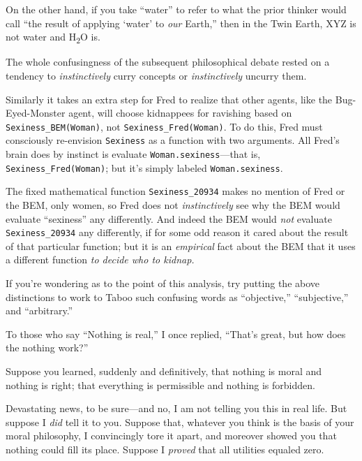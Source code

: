  On the other hand, if you take
``water'' to refer to what the prior
thinker would call ``the result of applying
`water' to \textit{our}
Earth,'' then in the Twin Earth, XYZ is not water and
H\textsubscript{2}O is.


 The whole confusingness of the subsequent philosophical debate
rested on a tendency to \textit{instinctively} curry concepts or
\textit{instinctively} uncurry them.


 Similarly it takes an extra step for Fred to realize that other
agents, like the Bug-Eyed-Monster agent, will choose kidnappees for
ravishing based on \texttt{Sexiness\_BEM(Woman)}, not \texttt{Sexiness\_Fred(Woman)}. To
do this, Fred must consciously re-envision \texttt{Sexiness} as a function with
two arguments. All Fred's brain does by instinct is
evaluate \texttt{Woman.sexiness}---that is, \texttt{Sexiness\_Fred(Woman)}; but
it's simply labeled \texttt{Woman.sexiness}.


 The fixed mathematical function \texttt{Sexiness\_20934} makes no mention
of Fred or the BEM, only women, so Fred does not \textit{instinctively}
see why the BEM would evaluate
``sexiness'' any differently. And
indeed the BEM would \textit{not} evaluate \texttt{Sexiness\_20934} any
differently, if for some odd reason it cared about the result of that
particular function; but it is an \textit{empirical} fact about the BEM
that it uses a different function \textit{to decide who to kidnap.}


 If you're wondering as to the point of this
analysis, try putting the above distinctions to work to Taboo such
confusing words as ``objective,''
``subjective,'' and
``arbitrary.''

\myendsectiontext



 To those who say ``Nothing is
real,'' I once replied,
``That's great, but how does the
nothing work?'' 


 Suppose you learned, suddenly and definitively, that nothing is
moral and nothing is right; that everything is permissible and nothing
is forbidden.


 Devastating news, to be sure---and no, I am not telling you this
in real life. But suppose I \textit{did} tell it to you. Suppose that,
whatever you think is the basis of your moral philosophy, I
convincingly tore it apart, and moreover showed you that nothing could
fill its place. Suppose I \textit{proved} that all utilities equaled
zero.


